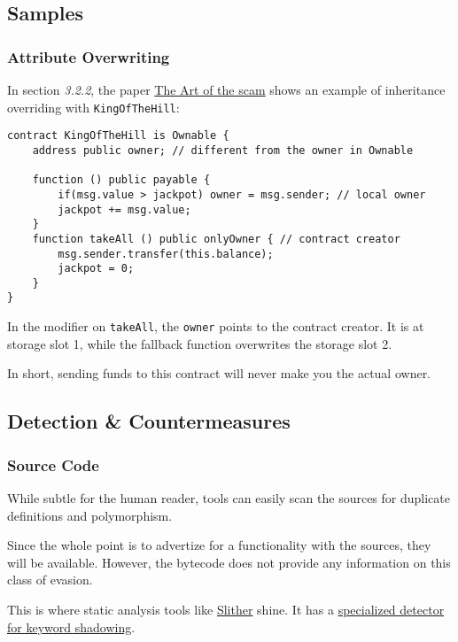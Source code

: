 \subsection{Samples}

\subsubsection{Attribute Overwriting}

In section \emph{3.2.2}, the paper \href{\urlpaperartofthescam}{The Art of the scam} shows an example of inheritance overriding with \lstinline{KingOfTheHill}:

\begin{lstlisting}[language=Solidity]
contract KingOfTheHill is Ownable {
    address public owner; // different from the owner in Ownable

    function () public payable {
        if(msg.value > jackpot) owner = msg.sender; // local owner
        jackpot += msg.value;
    }
    function takeAll () public onlyOwner { // contract creator
        msg.sender.transfer(this.balance);
        jackpot = 0;
    }
}
\end{lstlisting}

In the modifier on \lstinline{takeAll}, the \lstinline{owner} points to the contract creator.
It is at storage slot 1, while the fallback function overwrites the storage slot 2.

In short, sending funds to this contract will never make you the actual owner.

\subsection{Detection \& Countermeasures}

\subsubsection{Source Code}

While subtle for the human reader, tools can easily scan the sources for duplicate definitions and polymorphism.

Since the whole point is to advertize for a functionality with the sources, they will be available.
However, the bytecode does not provide any information on this class of evasion.

This is where static analysis tools like \href{\urlcodeslither}{Slither} shine.
It has a \href{\urlcodeslithervariableshadowing}{specialized detector for keyword shadowing}.
